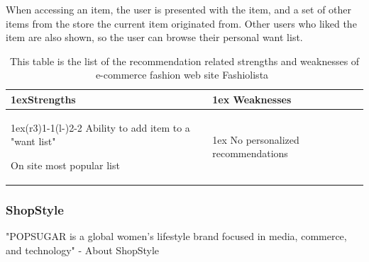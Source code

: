     When accessing an item, the user is presented with the item, and a set of other items from the store the current item originated from.
    Other users who liked the item are also shown, so the user can browse their personal want list.
    \begin{table}[H]
                    \centering
                    \begin{tabularx}{\linewidth}{>{\parskip1ex}X@{\kern4\tabcolsep}>{\parskip1ex}X}
                    \toprule
                    \hfil\bfseries Strengths
                    &
                    \hfil\bfseries Weaknesses
                    \\\cmidrule(r{3\tabcolsep}){1-1}\cmidrule(l{-\tabcolsep}){2-2}
                Ability to add item to a "want list" \par
                On site most popular list \par
             &
                 No personalized recommendations \par
             \\ \bottomrule
        \end{tabularx}
        \caption[Recommendation related strengths and weaknesses of Fashiolista~\cite{Fashiolista}]{This table is the list of the recommendation related strengths and weaknesses of e-commerce fashion web site Fashiolista~\cite{Fashiolista}}
        \label{table:ecommenreceFahiolista}
    \end{table}

\subsubsection{ShopStyle} %
\label{par:shopstyle}
    "POPSUGAR is a global women's lifestyle brand focused in media, commerce, and technology" - About ShopStyle~\cite{ShopStyle}

